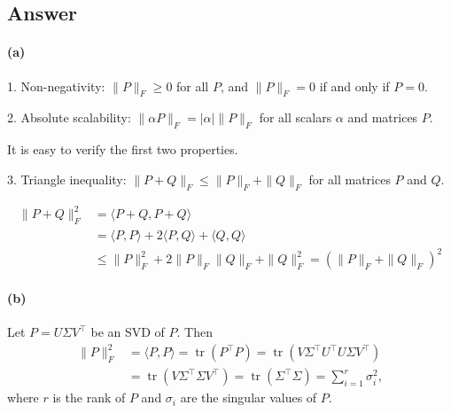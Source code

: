 \documentclass[
  12pt,
]{fphw}
\begin{document}
\subsection*{Answer}
\paragraph{(a)} %
1. Non-negativity: $\|P\|_F \geq 0$ for all $P$, and $\|P\|_F = 0$ if and only  if $P = 0$.

2. Absolute scalability: $\|\alpha P\|_F = |\alpha| \|P\|_F$ for all scalars $\alpha$ and matrices $P$.

It is easy to verify the first two properties.

3. Triangle inequality: $\|P + Q\|_F \leq \|P\|_F + \|Q\|_F$ for all matrices $P$ and $Q$.  

\begin{align*}
\|P + Q\|_F^2 &= \langle P + Q, P + Q\rangle \\
&= \langle P, P\rangle + 2\langle P, Q\rangle + \langle Q, Q\rangle \\
&\leq \|P\|_F^2 + 2\|P\|_ F \|Q\|_F + \|Q\|_F^2 = (\|P\|_F + \|Q\|_F)^2
\end{align*}


\paragraph{(b)} %
Let $P = U\Sigma V^\top$ be an SVD of $P$. Then
\begin{align*}
\|P\|_F^2 &= \langle P, P\rangle = \operatorname{tr}(P^\top P) = \operatorname{tr}(V\Sigma^\top U^\top U\Sigma V^\top) \\
&= \operatorname{tr}(V\Sigma^\top \Sigma V^\top) = \operatorname{tr}(\Sigma^\top \Sigma) = \sum_{i=1}^r \sigma_i^2,
\end{align*}
where $r$ is the rank of $P$ and $\sigma_i$ are the singular values of $P$. 

\end{document}
